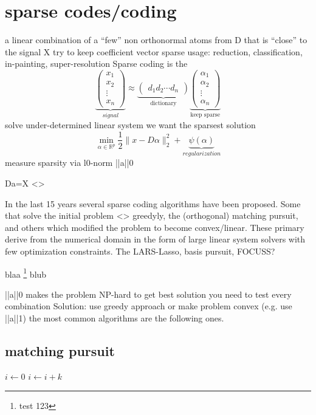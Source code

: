 \section{sparse codes/coding}
a linear combination of a “few” non orthonormal atoms from
D that is “close” to the signal X
try to keep coefficient vector sparse
usage: reduction, classification, in-painting,  super-resolution
Sparse coding is the 
\[
\underbrace{\begin{pmatrix} x_1 \\ x_2 \\ \vdots \\ x_n \end{pmatrix}}_{signal} \approx \underbrace{\begin{pmatrix} d_1  d_2 \cdots d_n \end{pmatrix}}_{\textrm{dictionary}}
\underbrace{\begin{pmatrix} \alpha_1 \\ \alpha_2 \\ \vdots \\ \alpha_n \end{pmatrix}}_{\textrm{keep sparse}}
\]
solve under-determined linear system
we want the sparsest solution
\[
\min_{\alpha\in\mathbb{R}^{p}} \frac{1}{2} \lVert x - D\alpha \rVert^{2}_{2} + \underbrace{\psi(\alpha)}_{regularization}
\] 
measure sparsity via       l0-norm       ||a||0

Da=X
<>

In the last 15 years several sparse coding algorithms have been proposed. 
Some that solve the initial problem <> greedyly, the (orthogonal) matching pursuit, and others which modified the problem to become convex/linear. These primary derive from the numerical domain in the form of 
large linear system solvers with few optimization constraints. The LARS-Lasso, basis pursuit, FOCUSS?


blaa \footnote{test 123} blub

||a||0 makes the problem NP-hard
to get best solution you need to test every combination
Solution:
use greedy approach or make problem convex (e.g. use ||a||1)
the most common algorithms are the following ones.

\subsection{matching pursuit}
\begin{algorithmic}
        \STATE $i\gets 0$
\ELSE
                \STATE $i\gets i+k$
        \ENDIF
\ENDIF 
\end{algorithmic}

